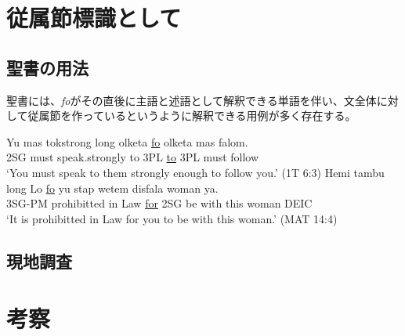 \section{従属節標識として}
\subsection{聖書の用法}
聖書には、\textit{fo}がその直後に主語と述語として解釈できる単語を伴い、文全体に対して従属節を作っているというように解釈できる用例が多く存在する。

\begin{exe}
\ex
\gll Yu mas tokstrong long olketa \underline{fo} olketa mas falom.\\
2SG must speak.strongly to 3PL \underline{to} 3PL must follow\\
\glt `You must speak to them strongly enough to follow you.' (1T 6:3)
\ex
\gll Hemi tambu long Lo \underline{fo} yu stap wetem disfala woman ya.\\
3SG-PM prohibitted in Law \underline{for} 2SG be with this woman DEIC\\
\glt `It is prohibitted in Law for you to be with this woman.' (MAT 14:4)
\end{exe}

\subsection{現地調査}

\section{考察}

